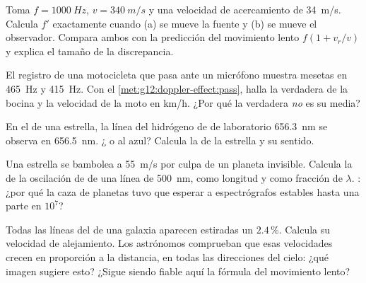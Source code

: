 \begin{exercise}[$\star\star$]\label{exo:g12:doppler-effect:9}
Toma $f = \qty{1000}{Hz}$, $v = \qty{340}{m/s}$ y una velocidad de
acercamiento de \qty{34}{m/s}. Calcula $f'$ exactamente cuando (a) se
mueve la fuente y (b) se mueve el observador. Compara ambos con la
predicción del movimiento lento $f(1 + v_r/v)$ y explica el tamaño de la
discrepancia.
\end{exercise}

\begin{exercise}[$\star\star$]\label{exo:g12:doppler-effect:10}
El registro de una motocicleta que pasa ante un micrófono muestra
mesetas en \qty{465}{Hz} y \qty{415}{Hz}. Con el
\cref{met:g12:doppler-effect:pass}, halla la  verdadera de la
bocina y la velocidad de la moto en \unit{km/h}. ¿Por qué la 
verdadera \emph{no} es su media?
\end{exercise}

\begin{exercise}[$\star\star$]\label{exo:g12:doppler-effect:11}
En el  de una estrella, la línea del hidrógeno de  de laboratorio \qty{656.3}{nm} se observa en \qty{656.5}{nm}.
¿ o al azul? Calcula la  de la
estrella y su sentido.
\end{exercise}

\begin{exercise}[$\star\star\star$]\label{exo:g12:doppler-effect:12}
Una estrella se bambolea a \qty{55}{m/s} por culpa de un planeta
invisible. Calcula la  de la oscilación de  de
una línea de \qty{500}{nm}, como longitud y como fracción de $\lambda$.
: ¿por qué la caza de planetas tuvo que esperar a
espectrógrafos estables hasta una parte en $10^{7}$?
\end{exercise}

\begin{exercise}[$\star\star\star$]\label{exo:g12:doppler-effect:13}
Todas las líneas del  de una galaxia aparecen estiradas un
$2.4\,\%$. Calcula su velocidad de alejamiento. Los astrónomos comprueban
que esas velocidades crecen en proporción a la distancia, en todas las
direcciones del cielo: ¿qué imagen sugiere esto? ¿Sigue siendo fiable
aquí la fórmula del movimiento lento?
\end{exercise}

